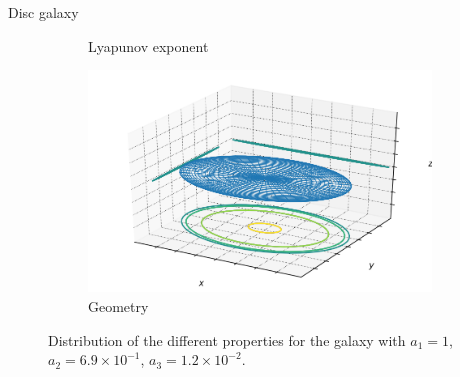 \documentclass[handout]{beamer}
\begin{document}
\begin{frame}{Disc galaxy}
\begin{figure}[h]
\begin{subfigure}[t]{0.35\textwidth}
			\caption{Lyapunov exponent}
		\end{subfigure}
		\begin{subfigure}[t]{0.35\textwidth}
			\includegraphics[width=\textwidth]{"../Files/Week 13/images/3_ellipsoid"}
			\caption{Geometry}
		\end{subfigure}
		\caption{Distribution of the different properties for the galaxy with $a_1 = 1$, $a_2 = 6.9\times10^{-1}$, $a_3 = 1.2\times10^{-2}$.}
	\end{figure}
\end{frame}
\end{document}

